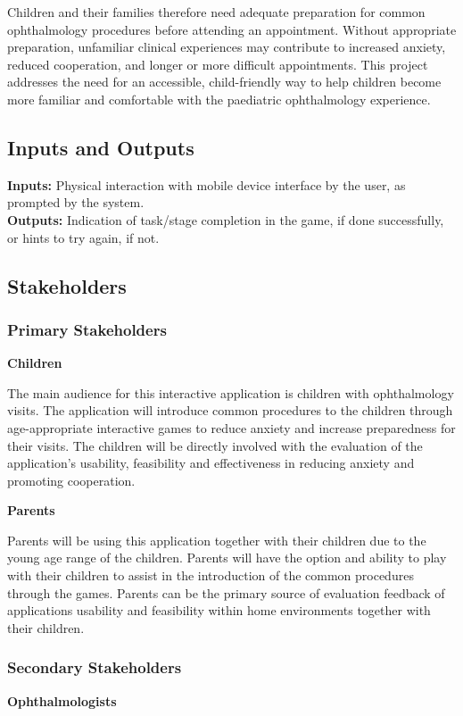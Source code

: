 \documentclass{article}
\begin{document}
Children and their families therefore need adequate preparation for common ophthalmology procedures before attending an appointment.
Without appropriate preparation, unfamiliar clinical experiences may contribute to increased anxiety, reduced cooperation, and longer or more difficult appointments.
This project addresses the need for an accessible, child-friendly way to help children become more familiar and comfortable with the paediatric ophthalmology experience.

\subsection{Inputs and Outputs}

\textbf{Inputs:} Physical interaction with mobile device interface by the user, as prompted by the system. \\
\textbf{Outputs:} Indication of task/stage completion in the game, if done successfully, or hints to try again, if not.

\subsection{Stakeholders}
    \subsubsection{Primary Stakeholders}
        \textbf{Children}

        The main audience for this interactive application is children with 
        ophthalmology visits. The application will introduce common procedures 
        to the children through age-appropriate interactive games to reduce anxiety 
        and increase preparedness for their visits. The children will be directly 
        involved with the evaluation of the application's usability, feasibility 
        and effectiveness in reducing anxiety and promoting cooperation.

        \textbf{Parents}

        Parents will be using this application together with their children due to the 
        young age range of the children. Parents will have the option and ability to 
        play with their children to assist in the introduction of the common 
        procedures through the games. Parents can be the primary source of evaluation 
        feedback of applications usability and feasibility within home environments 
        together with their children.

    \subsubsection{Secondary Stakeholders}
        \textbf{Ophthalmologists}
\end{document}
